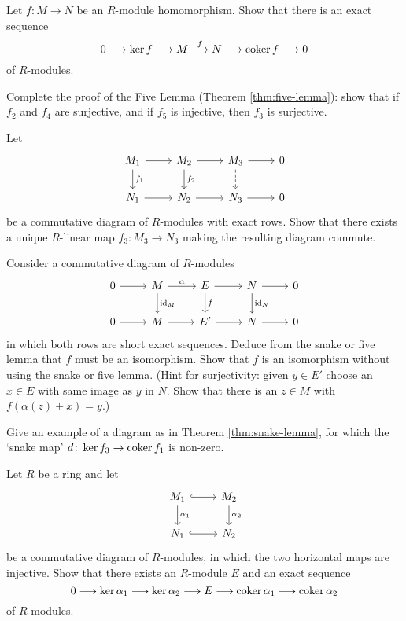 \begin{exercise}Let $f\colon M\to  N$ be an $R$-module homomorphism. Show that there is an exact sequence
\[
	0 \longrightarrow \ker f \longrightarrow M \overset{f}{\longrightarrow} N \longrightarrow \operatorname{coker} f \longrightarrow 0
\]
of $R$-modules.
\end{exercise}

\begin{exercise}\label{exc:five-lemma-part-2}
Complete the proof of the Five Lemma (Theorem \ref{thm:five-lemma}): show that if $f_2$ and $f_4$ are surjective, and if $f_5$ is injective, then $f_3$ is surjective. 
\end{exercise}

\begin{exercise}
Let
\[
\begin{tikzcd}
	M_1 \arrow{r} \arrow{d}{f_1}
	& M_2  \arrow{r} \arrow{d}{f_2}
	& M_3 \arrow{r} \arrow[dashed]{d}{}  & 0 \\
 N_1 \arrow{r} & N_2 \arrow{r} & N_3 \arrow{r} & 0
\end{tikzcd}
\]
be a commutative diagram of $R$-modules with exact rows. Show that there exists a unique $R$-linear map $f_3\colon M_3 \to N_3$ making the resulting diagram commute.
\end{exercise}

\begin{exercise}\label{exc:morphism-of-extensions-is-isomorphism}
Consider a commutative diagram of $R$-modules
\[
\begin{tikzcd}
0 \arrow{r}
	& M \arrow{r}{\alpha} \arrow{d}{\id_M}
	& E \arrow{r} \arrow{d}{f}
	& N \arrow{r} \arrow{d}{\id_N} & 0 \\
0 \arrow{r} & M \arrow{r} & E' \arrow{r} & N \arrow{r} & 0
\end{tikzcd}
\]
in which both rows are short exact sequences. Deduce from the snake or five lemma that $f$ must be an isomorphism. Show that $f$ is  an isomorphism without using the snake or five lemma. (Hint for surjectivity: given $y\in E'$ choose an $x\in E$ with same image as $y$ in $N$. Show that there is an $z\in M$ with $f(\alpha(z)+x)=y$.)
\end{exercise}

\begin{exercise}
Give an example of a diagram as in Theorem \ref{thm:snake-lemma}, for which the `snake map' $d\colon \ker f_3 \to \operatorname{coker} f_1$ is non-zero.
\end{exercise}


\begin{exercise}\label{exc:square-snake}
Let $R$ be a ring and let
\[
\begin{tikzcd}
M_1 \arrow[hook]{r} \arrow{d}{\alpha_1} & M_2 \arrow{d}{\alpha_2} \\
N_1 \arrow[hook]{r} & N_2 
\end{tikzcd}
\]
be a commutative diagram of $R$-modules, in which the two horizontal maps are injective. Show that there exists an $R$-module $E$ and an exact sequence
\[
	0 \longrightarrow \ker \alpha_1 \longrightarrow \ker \alpha_2 \longrightarrow E \longrightarrow \operatorname{coker} \alpha_1 \longrightarrow \operatorname{coker} \alpha_2
\]
of $R$-modules.
\end{exercise}


